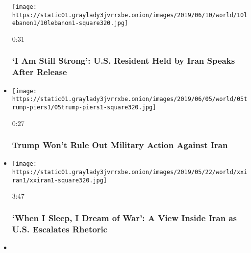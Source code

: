 \begin{itemize}
  \texttt{[image: https://static01.graylady3jvrrxbe.onion/images/2019/06/10/world/10lebanon1/10lebanon1-square320.jpg]}

  0:31

  \hypertarget{i-am-still-strong-us-resident-held-by-iran-speaks-after-release}{%
  \subsubsection{`I Am Still Strong': U.S. Resident Held by Iran Speaks
  After
  Release}\label{i-am-still-strong-us-resident-held-by-iran-speaks-after-release}}
\item
  \href{https://www.nytimes3xbfgragh.onion/video/us/politics/100000006541905/trump-military-action-iran.html?action=click\&module=video-series-bar\&region=header\&pgtype=Article\&playlistId=video/us-iran-relations}{}

  \texttt{[image: https://static01.graylady3jvrrxbe.onion/images/2019/06/05/world/05trump-piers1/05trump-piers1-square320.jpg]}

  0:27

  \hypertarget{trump-wont-rule-out-military-action-against-iran}{%
  \subsubsection{Trump Won't Rule Out Military Action Against
  Iran}\label{trump-wont-rule-out-military-action-against-iran}}
\item
  \href{https://www.nytimes3xbfgragh.onion/video/world/middleeast/100000006513619/when-i-sleep-i-dream-of-war-a-view-inside-iran-as-us-escalates-rhetoric.html?action=click\&module=video-series-bar\&region=header\&pgtype=Article\&playlistId=video/us-iran-relations}{}

  \texttt{[image: https://static01.graylady3jvrrxbe.onion/images/2019/05/22/world/xxiran1/xxiran1-square320.jpg]}

  3:47

  \hypertarget{when-i-sleep-i-dream-of-war-a-view-inside-iran-as-us-escalates-rhetoric}{%
  \subsubsection{`When I Sleep, I Dream of War': A View Inside Iran as
  U.S. Escalates
  Rhetoric}\label{when-i-sleep-i-dream-of-war-a-view-inside-iran-as-us-escalates-rhetoric}}
\item
  \href{https://www.nytimes3xbfgragh.onion/video/business/100000005890055/doing-business-in-iran-is-risky-exhibit-a-the-carmaker-peugeot.html?action=click\&module=video-series-bar\&region=header\&pgtype=Article\&playlistId=video/us-iran-relations}{}


\end{itemize}
